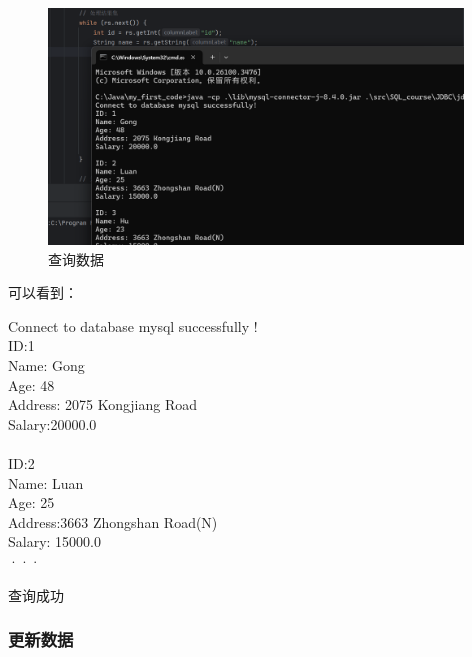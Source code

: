 \documentclass{article}
\begin{document}
	\begin{figure}[H]
		\centering
		\includegraphics[width=11cm]{./images/10.查询数据.png}
		\caption{查询数据}
	\end{figure}
	
	可以看到：
	
	Connect to database mysql successfully !\\
	ID:1\\
	Name: Gong\\
	Age: 48\\
	Address: 2075 Kongjiang Road\\
	Salary:20000.0\\\\
	ID:2\\
	Name: Luan\\
	Age: 25\\
	Address:3663 Zhongshan Road(N)\\
	Salary: 15000.0\\
	
	···
	
	查询成功
	
	\subsubsection{更新数据}
	
\end{document}

